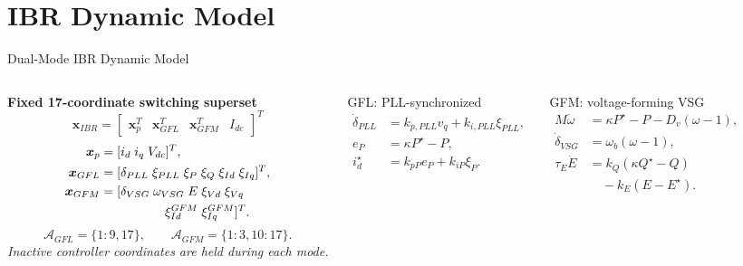 \documentclass{beamer}
\begin{document}
\section{IBR Dynamic Model}
\begin{frame}{Dual-Mode IBR Dynamic Model}
\begin{columns}[t,onlytextwidth]
\scriptsize
\textbf{Fixed 17-coordinate switching superset}
\[
\bm{x}_{IBR}=\begin{bmatrix}
\bm{x}_{p}^{T}&\bm{x}_{GFL}^{T}&\bm{x}_{GFM}^{T}&I_{dc}
\end{bmatrix}^{T}
\]
\begin{align*}
\bm{x}_{p}&=[i_d\;i_q\;V_{dc}]^T,\\
\bm{x}_{GFL}&=[\delta_{PLL}\;\xi_{PLL}\;\xi_P\;\xi_Q\;\xi_{Id}\;\xi_{Iq}]^T,\\
\bm{x}_{GFM}&=[\delta_{VSG}\;\omega_{VSG}\;E\;\xi_{Vd}\;\xi_{Vq}\\
&\hspace{1.8cm}\xi_{Id}^{GFM}\;\xi_{Iq}^{GFM}]^T.
\end{align*}
\[
\mathcal{A}_{GFL}=\{1{:}9,17\},\qquad
\mathcal{A}_{GFM}=\{1{:}3,10{:}17\}.
\]
\textit{Inactive controller coordinates are held during each mode.}
\scriptsize
\begin{block}{GFL: PLL-synchronized}
\begin{align*}
\dot\delta_{PLL}&=k_{p,PLL}v_q+k_{i,PLL}\xi_{PLL},\\
e_P&=\kappa P^\star-P,\\
i_d^\star&=k_{pP}e_P+k_{iP}\xi_P.
\end{align*}
\end{block}
\begin{block}{GFM: voltage-forming VSG}
\begin{align*}
M\dot\omega&=\kappa P^\star-P-D_v(\omega-1),\\
\dot\delta_{VSG}&=\omega_b(\omega-1),\\
\tau_E\dot E&=k_Q(\kappa Q^\star-Q)\\
&\quad-k_E(E-E^\star).
\end{align*}
\end{block}
\end{columns}
\end{frame}
\end{document}
